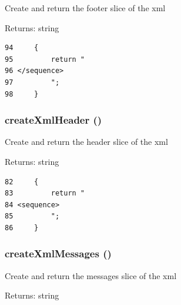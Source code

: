 Create and return the footer slice of the xml

\begin{Desc}
\item[Returns:]string \end{Desc}


\begin{Code}\begin{verbatim}94     {
95         return "
96 </sequence>
97         ";
98     }
\end{verbatim}
\end{Code}


\hypertarget{class_xml_sequence_printer_xml_df4117a74e93f6f53e068d0859691cce}{
\subsubsection[{createXmlHeader}]{\setlength{\rightskip}{0pt plus 5cm}createXmlHeader ()}}
\label{class_xml_sequence_printer_xml_df4117a74e93f6f53e068d0859691cce}


Create and return the header slice of the xml

\begin{Desc}
\item[Returns:]string \end{Desc}


\begin{Code}\begin{verbatim}82     {
83         return "
84 <sequence>
85         ";
86     }
\end{verbatim}
\end{Code}


\hypertarget{class_xml_sequence_printer_xml_aab9daae34ba6e135b791ec3eaad7c7d}{
\subsubsection[{createXmlMessages}]{\setlength{\rightskip}{0pt plus 5cm}createXmlMessages ()}}
\label{class_xml_sequence_printer_xml_aab9daae34ba6e135b791ec3eaad7c7d}


Create and return the messages slice of the xml

\begin{Desc}
\item[Returns:]string \end{Desc}



